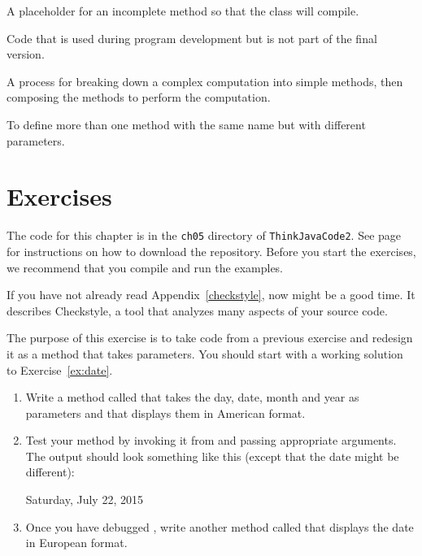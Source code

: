 \begin{description}
A placeholder for an incomplete method so that the class will compile.

Code that is used during program development but is not part of the final version.

A process for breaking down a complex computation into simple methods, then composing the methods to perform the computation.

To define more than one method with the same name but with different parameters.

\end{description}


\section{Exercises}

The code for this chapter is in the {\tt ch05} directory of {\tt ThinkJavaCode2}.
See page~\pageref{code} for instructions on how to download the repository.
Before you start the exercises, we recommend that you compile and run the examples.

If you have not already read Appendix~\ref{checkstyle}, now might be a good time.
It describes Checkstyle, a tool that analyzes many aspects of your source code.


\begin{exercise}  %

The purpose of this exercise is to take code from a previous exercise and redesign it as a method that takes parameters.
You should start with a working solution to Exercise~\ref{ex:date}.

\begin{enumerate}

\item Write a method called  that takes the day, date, month and year as parameters and that displays them in American format.

\item Test your method by invoking it from  and passing appropriate arguments.
The output should look something like this (except that the date might be different):

\begin{stdout}
Saturday, July 22, 2015
\end{stdout}

\item Once you have debugged , write another method called  that displays the date in European format.

\end{enumerate}

\end{exercise}


